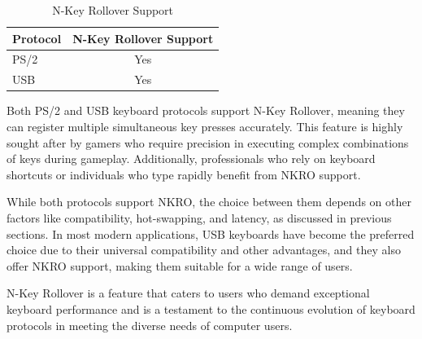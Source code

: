 \begin{table}[htbp]
    \centering
    \caption{N-Key Rollover Support}
    \begin{tabular}{|l|c|}
        \hline
        \textbf{Protocol} & \textbf{N-Key Rollover Support} \\
        \hline
        PS/2 & Yes \\
        \hline
        USB & Yes \\
        \hline
    \end{tabular}
\end{table}

Both PS/2 and USB keyboard protocols support N-Key Rollover, meaning they can register multiple simultaneous key presses accurately. This feature is highly sought after by gamers who require precision in executing complex combinations of keys during gameplay. Additionally, professionals who rely on keyboard shortcuts or individuals who type rapidly benefit from NKRO support.

While both protocols support NKRO, the choice between them depends on other factors like compatibility, hot-swapping, and latency, as discussed in previous sections. In most modern applications, USB keyboards have become the preferred choice due to their universal compatibility and other advantages, and they also offer NKRO support, making them suitable for a wide range of users.

N-Key Rollover is a feature that caters to users who demand exceptional keyboard performance and is a testament to the continuous evolution of keyboard protocols in meeting the diverse needs of computer users.



